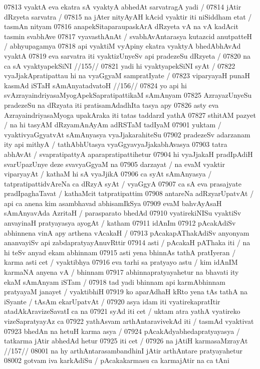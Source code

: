 07813 	vyaktA eva ekatra sA vyaktyA abhedAt sarvatragA yadi / 
07814 	jAtir dRzyeta sarvatra / 
07815 na jAter nityAyAH kAcid vyaktir iti niSiddham etat / tasmAn nityam
07816 anapekSitaparaupaskArA dRzyeta vA na vA kadAcit tasmin svabhAve
07817 vyavasthAnAt / svabhAvAntarasya kutazcid anutpatteH / abhyupagamya
07818 api vyaktiM vyApiny ekatra vyaktyA bhedAbhAvAd vyaktA  
07819 eva sarvatra iti vyaktizUnyeSv api pradezeSu dRzyeta /
07820 	na ca sA vyaktyapekSiNI //155//  
07821 yadi hi vyaktyapekSiNI syAt /
07822 	vyaJjakApratipattau hi na vyaGgyaM sampratIyate /  
07823 	viparyayaH punaH kasmAd iSTaH sAmAnyatadvatoH //156//
07824 yo api hi svAzrayaindriyasaMyogApekSapratipattikaM sAmAnyam 
07825 AzrayazUnyeSu pradezeSu na dRzyata iti pratisamAdadhIta tasya apy 
07826 asty eva AzrayaindriyasaMyoga upakAraka iti tatas taddarzI yathA  
07827 sthitAM pazyet / na hi tasyAM dRzyamAnAyAm adRSTaM tadIyaM 
07901 yuktam / vyaktivyaGgyatvAt sAmAnyasya vyaJjakarahiteSu
07902 pradezeSv adarzanam ity api mithyA / tathAbhUtasya vyaGgyavyaJjakabhAvasya
07903 tatra abhAvAt / svapratipattyA aparapratipattihetur  
07904 hi vyaJjakaH pradIpAdiH svarUpazUnye deze svavyaGgyaM na 
07905 darzayat / na evaM vyaktir viparyayAt / kathaM hi sA vyaJjikA 
07906 ca syAt sAmAnyasya / tatpratipattidvAreNa ca dRzyA syAt / vyaGgyA
07907 ca sA eva prasajyate pradIpaghaTavat / kathaMcit tatpratipattim
07908 antareNa adRzyarUpatvAt / api ca anena kim asambhavad  abhisamIkSya
07909 evaM bahvAyAsaH sAmAnyavAda AzritaH / parasparato bhedAd
07910 vyatirekiNISu vyaktiSv anvayinaH pratyayasya ayogAt / katham
07911 idAnIm
07912 	pAcakAdiSv abhinnena vinA apy arthena vAcakaH / 
07913 pAcakapAThakAdiSv anyonyam ananvayiSv api zabdapratyayAnuvRttir  
07914 asti / pAcakaH pAThaka iti / na hi teSv anyad ekam abhinnam 
07915 asti yena bhinnAs tathA pratIyeran / karma asti cet / vyaktibhya 
07916 eva tarhi sa pratyayo astu / kim idAnIM karmaNA anyena vA / bhinnam
07917 abhinnapratyayahetur na bhavati ity ekaM sAmAnyam iSTam / 
07918 tad yadi bhinnam api karmAbhinnam pratyayaM janayet / vyaktibhiH 
07919 ko aparAdhaH kRto yena tAs tathA na iSyante / tAsAm ekarUpatvAt / 
07920 asya idam iti vyatirekapratItir atadAkAravizeSavatI ca na 
07921 syAd iti cet / uktam atra yathA vyatireko vizeSapratyayAz ca 
07922 yathAsvam arthAntaravivekAd iti / tasmAd vyaktivat  
07923 	bhedAn na hetuH karma asya /
07924 pAcakAdyabhedapratyayasya / tatkarma jAtir abhedAd hetur
07925 iti cet /  
07926 	na jAtiH karmasaMzrayAt //157//  
08001 na hy arthAntarasambandhinI jAtir arthAntare pratyayahetur  
08002 gotvam iva karkAdiSu / pAcakakarmasu ca karmajAtir na ca tAni  
